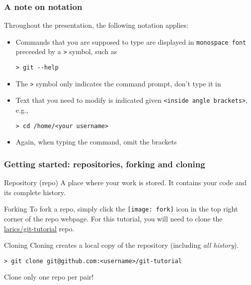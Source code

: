 
\begin{frame}[fragile]

\frametitle{A note on notation}
	
Throughout the presentation, the following notation applies:

\begin{itemize}
	\item Commands that you are supposed to type are displayed in \texttt{monospace font} preceeded by a \texttt{>} symbol, such as
	\begin{verbatim}
> git --help
	\end{verbatim}
	\item The \texttt{>} symbol only indicates the command prompt, don't type it in
	\item Text that you need to modify is indicated given \texttt{<inside angle brackets>}, e.g.,
	\begin{verbatim}
> cd /home/<your username>
	\end{verbatim}
	\item Again, when typing the command, omit the brackets
\end{itemize}

\end{frame}


\begin{frame}[fragile]

\frametitle{Getting started: repositories, forking and cloning}

\begin{block}{Repository (repo)}
	A place where your work is stored. It contains your code and its complete history. 
\end{block}

\begin{block}{Forking}
	To fork a repo, simply click the \texttt{[image: fork]} icon in the top right corner of the repo webpage. For this tutorial, you will need to clone the \href{https://github.com/larics/git-tutorial}{larics/git-tutorial} repo.
\end{block}

\begin{block}{Cloning}
	Cloning creates a local copy of the repository (including \emph{all history}).	
	\begin{verbatim}
> git clone git@github.com:<username>/git-tutorial
	\end{verbatim}
	Clone only one repo per pair!
\end{block}

\end{frame}
	
